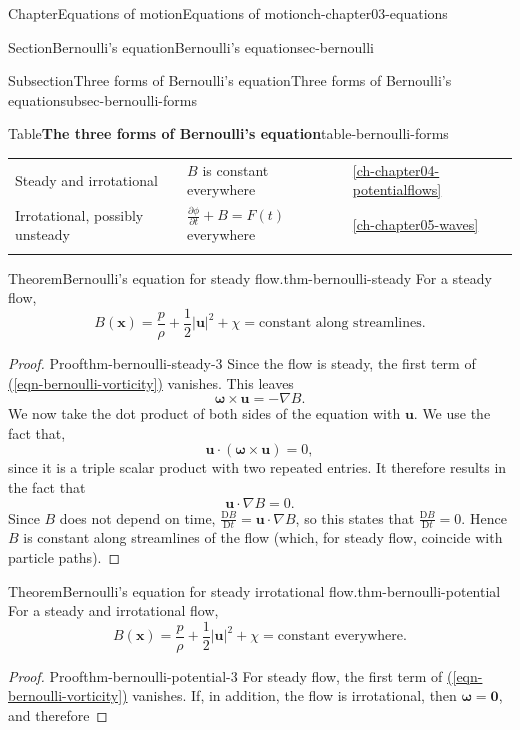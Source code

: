 \documentclass[oneside,10pt,]{book}
\newcommand{\xreffont}{\relax}
\numberwithin{equation}{section}
\newcommand{\ptxhrulethick} {\noalign{\hrule height 0.11em}}
\newcommand{\DD}[2]{\frac{\mathrm{D}#1}{\mathrm{D}#2}}
\newcommand{\pd}[2]{\frac{\partial#1}{\partial#2}}
\newcommand{\bx}{\boldsymbol{x}}
\newcommand{\bu}{\boldsymbol{u}}
\newcommand{\bomega}{\boldsymbol{\omega}}
\begin{document}
\begin{chapterptx}{Chapter}{Equations of motion}{}{Equations of motion}{}{}{ch-chapter03-equations}
\begin{sectionptx}{Section}{Bernoulli's equation}{}{Bernoulli's equation}{}{}{sec-bernoulli}
\begin{subsectionptx}{Subsection}{Three forms of Bernoulli's equation}{}{Three forms of Bernoulli's equation}{}{}{subsec-bernoulli-forms}
\begin{tableptx}{Table}{\textbf{The three forms of Bernoulli's equation}}{table-bernoulli-forms}{}
{\begin{tabular}{lll}
Steady and irrotational&\(B\) is constant everywhere&\hyperref[ch-chapter04-potentialflows]{{\xreffont\ref{ch-chapter04-potentialflows}}}\tabularnewline\ptxhrulethick
Irrotational, possibly unsteady&\(\pd{\phi}{t} + B = F(t)\) everywhere&\hyperref[ch-chapter05-waves]{{\xreffont\ref{ch-chapter05-waves}}}\tabularnewline\ptxhrulethick
\end{tabular}
}%
\end{tableptx}%
\begin{theorem}{Theorem}{Bernoulli's equation for steady flow.}{}{thm-bernoulli-steady}%
For a steady flow,%
\begin{equation}
B(\bx) = \frac{p}{\rho} + \frac{1}{2} |\bu|^2 + \chi = \textrm{constant along
streamlines}.\label{eqn-bernoulli-steady}
\end{equation}
%
\end{theorem}
\begin{proof}{Proof}{}{thm-bernoulli-steady-3}
Since the flow is steady, the first term of \hyperref[eqn-bernoulli-vorticity]{({\xreffont\ref{eqn-bernoulli-vorticity}})} vanishes. This leaves%
\begin{equation*}
\bomega \times \bu = -\nabla B.
\end{equation*}
We now take the dot product of both sides of the equation with \(\bu\). We use the fact that,%
\begin{equation*}
\bu \cdot (\bomega \times \bu ) = 0,
\end{equation*}
since it is a triple scalar product with two repeated entries. It therefore results in the fact that%
\begin{equation*}
\bu \cdot \nabla B = 0.
\end{equation*}
Since \(B\) does not depend on time, \(\DD{B}{t} = \bu \cdot \nabla B\), so this states that \(\DD{B}{t} = 0\). Hence \(B\) is constant along streamlines of the flow (which, for steady flow, coincide with particle paths).%
\end{proof}
\begin{theorem}{Theorem}{Bernoulli's equation for steady irrotational flow.}{}{thm-bernoulli-potential}%
For a steady and irrotational flow,%
\begin{equation}
B(\bx) = \frac{p}{\rho} + \frac{1}{2} |\bu|^2 + \chi = \textrm{constant
everywhere}.\label{eqn-bernoulli-potential}
\end{equation}
%
\end{theorem}
\begin{proof}{Proof}{}{thm-bernoulli-potential-3}
For steady flow, the first term of \hyperref[eqn-bernoulli-vorticity]{({\xreffont\ref{eqn-bernoulli-vorticity}})} vanishes. If, in addition, the flow is irrotational, then \(\bomega = \mathbf{0}\), and therefore%

\end{proof}
\end{subsectionptx}
\end{sectionptx}
\end{chapterptx}
\end{document}
